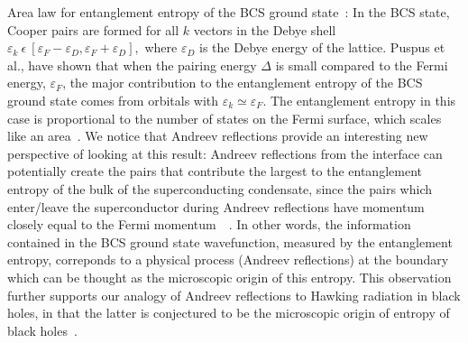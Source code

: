 \documentclass[12pt,letterpaper,aps,onecolumn,superscriptaddress,floatfix,notitlepage]{revtex4-1}
\begin{document}
	Area law for entanglement entropy of the BCS ground state~\cite{puspus2014entanglement}: In the BCS state, Cooper pairs are formed for all $k$ vectors in the Debye shell $\varepsilon_{k}~\epsilon~[\varepsilon_{F}-\varepsilon_{D},\varepsilon_{F}+\varepsilon_{D}],$ where $\varepsilon_{D}$ is the Debye energy of the lattice. Puspus et al., have shown that when the pairing energy $\Delta$ is small compared to the Fermi energy, $\varepsilon_{F}$, the major contribution to the entanglement entropy of the BCS ground state comes from orbitals with $\varepsilon_{k}\simeq\varepsilon_{F}$. The entanglement entropy in this case is proportional to the number of states on the Fermi surface, which scales like an area~\cite{puspus2014entanglement}.  We notice that Andreev reflections provide an interesting new perspective of looking at this result: Andreev reflections from the interface can potentially create the pairs that contribute the largest to the entanglement entropy of the bulk of the superconducting condensate, since the pairs which enter/leave the superconductor during Andreev reflections have momentum closely equal to the Fermi momentum~~\cite{andreev,Pannet,spintron,artemenko1978excess,artemenko1979theory,artemenko1979excess,zaitsev1980theory}. In other words, the information contained in the BCS ground state wavefunction, measured by the entanglement entropy, correponds to a physical process (Andreev reflections) at the boundary which can be thought as the microscopic origin of this entropy. This observation further supports our analogy of Andreev reflections to Hawking radiation in black holes, in that the latter is conjectured to be the microscopic origin of entropy of black holes~\cite{srednicki1993entropy,das2008black,bombelli1986quantum}.
	
\end{document}
